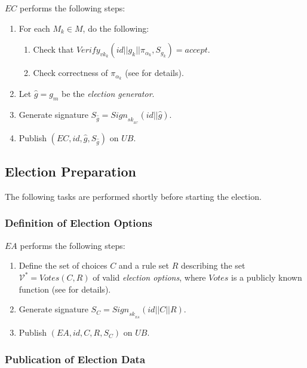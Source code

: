 \documentclass[bibtotoc,halfparskip,oneside]{scrreprt}
\newcommand{\eid}{\mathit{id}\xspace}
\newcommand{\sk}[1]{\mathit{sk}_{#1}\xspace}
\newcommand{\vk}[1]{\mathit{vk}_{#1}\xspace}
\newcommand{\SK}[1]{\sk{_#1}\xspace}
\newcommand{\EA}{\ensuremath{\mathit{EA}}\xspace}
\newcommand{\EC}{\ensuremath{\mathit{EC}}\xspace}
\newcommand{\UB}{\ensuremath{\mathit{UB}}\xspace}
\newcommand{\Mixer}[1]{\ensuremath{\mathit{M}_{#1}}\xspace}
\begin{document}
\EC performs the following steps:
\begin{enumerate}[resume]
	\item For each $\Mixer{k}\in M$, do the following:
	\begin{enumerate}
		\item Check that $\mathit{Verify}_{\vk{k}}(\eid||g_k||\pi_{\alpha_k},S_{g_k})=\mathit{accept}$.
		\item Check correctness of $\pi_{\alpha_k}$ (see  for details).
	\end{enumerate}
	\item Let $\hat{g}=g_m$ be the \emph{election generator}.
	\item Generate signature $S_{\hat{g}}=\mathit{Sign}_{\SK{\EC}}(\eid||\hat{g})$.
	\item Publish $(\EC,\eid,\hat{g},S_{\hat{g}})$ on \UB. 
\end{enumerate}

\subsection{Election Preparation}\label{preparation}

The following tasks are performed shortly before starting the election.

\subsubsection{Definition of Election Options}

\EA performs the following steps:
\begin{enumerate}
	\item Define the set of choices $C$ and a rule set $R$ describing the set $\mathcal{V}^*=\mathit{Votes}(C,R)$ of valid \emph{election options}, where $\mathit{Votes}$ is a publicly known function (see  for details).
	\item Generate signature $S_C=\mathit{Sign}_{\SK{\EA}}(\eid||C||R)$.
	\item Publish $(\EA,\eid,C,R,S_C)$ on \UB.
\end{enumerate}

\subsubsection{Publication of Election Data}
\end{document}
